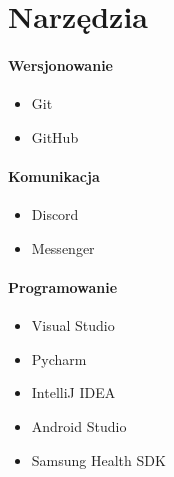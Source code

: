 \documentclass[12pt]{article}
\begin{document}
    \section*{Narzędzia}

        \paragraph*{Wersjonowanie}
            \begin{itemize}
                \item Git
                \item GitHub
            \end{itemize}

        \paragraph*{Komunikacja}
            \begin{itemize}
                \item Discord
                \item Messenger
            \end{itemize}
        
        \paragraph*{Programowanie}
            \begin{itemize}
                \item Visual Studio 
                \item Pycharm
                \item IntelliJ IDEA
                \item Android Studio
                \item Samsung Health SDK
            \end{itemize}
\end{document}
